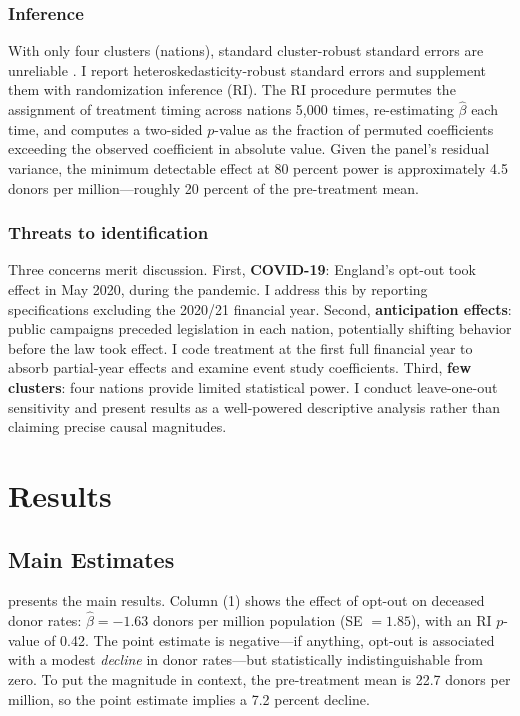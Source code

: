 \documentclass[12pt]{article}
\begin{document}
\subsubsection*{Inference} With only four clusters (nations), standard cluster-robust standard errors are unreliable \citep{cameron2008bootstrap}. I report heteroskedasticity-robust standard errors and supplement them with randomization inference (RI). The RI procedure permutes the assignment of treatment timing across nations 5,000 times, re-estimating $\hat{\beta}$ each time, and computes a two-sided $p$-value as the fraction of permuted coefficients exceeding the observed coefficient in absolute value. Given the panel's residual variance, the minimum detectable effect at 80 percent power is approximately 4.5 donors per million---roughly 20 percent of the pre-treatment mean.

\subsubsection*{Threats to identification} Three concerns merit discussion. First, \textbf{COVID-19}: England's opt-out took effect in May 2020, during the pandemic. I address this by reporting specifications excluding the 2020/21 financial year. Second, \textbf{anticipation effects}: public campaigns preceded legislation in each nation, potentially shifting behavior before the law took effect. I code treatment at the first full financial year to absorb partial-year effects and examine event study coefficients. Third, \textbf{few clusters}: four nations provide limited statistical power. I conduct leave-one-out sensitivity and present results as a well-powered descriptive analysis rather than claiming precise causal magnitudes.

\section{Results}

\subsection{Main Estimates}

 presents the main results. Column (1) shows the effect of opt-out on deceased donor rates: $\hat{\beta} = -1.63$ donors per million population (SE $= 1.85$), with an RI $p$-value of 0.42. The point estimate is negative---if anything, opt-out is associated with a modest \textit{decline} in donor rates---but statistically indistinguishable from zero. To put the magnitude in context, the pre-treatment mean is 22.7 donors per million, so the point estimate implies a 7.2 percent decline.
\end{document}
